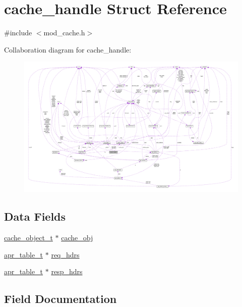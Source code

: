 \hypertarget{structcache__handle}{}\section{cache\+\_\+handle Struct Reference}
\label{structcache__handle}


{\ttfamily \#include $<$mod\+\_\+cache.\+h$>$}



Collaboration diagram for cache\+\_\+handle\+:
\nopagebreak
\begin{figure}[H]
\begin{center}
\leavevmode
\includegraphics[width=350pt]{structcache__handle__coll__graph}
\end{center}
\end{figure}
\subsection*{Data Fields}
\begin{DoxyCompactItemize}
\item 
\hyperlink{group__MOD__CACHE_gaad2b9c797c4773148b3ff5e1485de21e}{cache\+\_\+object\+\_\+t} $\ast$ \hyperlink{structcache__handle_aea71e9fd166a32e0fe46a12668a1f3bd}{cache\+\_\+obj}
\item 
\hyperlink{structapr__table__t}{apr\+\_\+table\+\_\+t} $\ast$ \hyperlink{structcache__handle_a3d302af4d74f9067d16e6398f0b709ae}{req\+\_\+hdrs}
\item 
\hyperlink{structapr__table__t}{apr\+\_\+table\+\_\+t} $\ast$ \hyperlink{structcache__handle_a66c4c1875bb9740d34ddda4d3e71065e}{resp\+\_\+hdrs}
\end{DoxyCompactItemize}


\subsection{Field Documentation}
